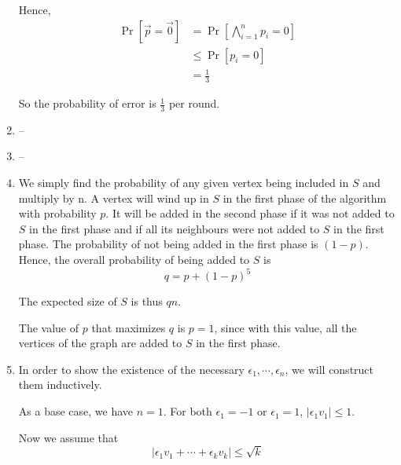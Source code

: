 \documentclass[letterpaper,11pt]{article}
\begin{document}
\begin{enumerate}
        Hence,
        \begin{align*}
            \Pr{[\vec p = \vec 0]}
            &= \Pr{[\bigwedge_{i = 1}^n p_i = 0]} \\
                &\leq \Pr{[p_i = 0]} \\
                &= \frac{1}{3}
        \end{align*}

        So the probability of error is $\frac{1}{3}$ per round.

    \item
        --

    \item
        --

    \item
        We simply find the probability of any given vertex being included in
        $S$ and multiply by n. A vertex will wind up in $S$ in the first
        phase of the algorithm with probability $p$. It will be added in the
        second phase if it was not added to $S$ in the first phase and if all
        its neighbours were not added to $S$ in the first phase. The
        probability of not being added in the first phase is $(1 - p)$. Hence,
        the overall probability of being added to $S$ is
        $$q = p + (1 - p)^5$$

        The expected size of $S$ is thus $qn$.

        The value of $p$ that maximizes $q$ is $p = 1$, since with this value,
        all the vertices of the graph are added to $S$ in the first phase.
        
    \item
        In order to show the existence of the necessary
        $\epsilon_1, \cdots, \epsilon_n$, we will construct them inductively.

        As a base case, we have $n = 1$. For both $\epsilon_1 = -1$ or
        $\epsilon_1 = 1$, $|\epsilon_1 v_1| \leq 1$.

        Now we assume that
        $$|\epsilon_1 v_1 + \cdots + \epsilon_k v_k| \leq \sqrt{k}$$


\end{enumerate}
\end{document}
